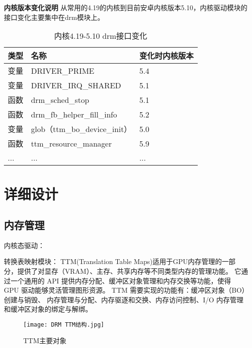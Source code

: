 \textbf{内核版本变化说明}
从常用的4.19的内核到目前安卓内核版本5.10，内核驱动模块的接口变化主要集中在drm模块上。
\begin{table}[h]
  \centering
  \caption{内核4.19-5.10 drm接口变化}
  \begin{tabular}{lll}
    \toprule
    类型   &   名称  &变化时内核版本  \\
    \midrule
    变量 & DRIVER\_PRIME & 5.4 \\
    变量 & DRIVER\_IRQ\_SHARED & 5.1 \\
    函数 & drm\_sched\_stop & 5.1 \\
    函数 & drm\_fb\_helper\_fill\_info & 5.2 \\
    变量 & glob（ttm\_bo\_device\_init） & 5.0 \\
    函数 & ttm\_resource\_manager & 5.9 \\
    ... & ... & ... \\
    \bottomrule
  \end{tabular}
\end{table}

\section{详细设计}
\subsection{内存管理}
内核态驱动：

转换表映射模块：
TTM(Translation Table Maps)适用于GPU内存管理的一部分，提供了对显存（VRAM）、主存、共享内存等不同类型内存的管理功能。
它通过一个通用的 API 提供内存分配、缓冲区对象管理和内存交换等功能，使得 GPU 驱动能够灵活管理图形资源。
TTM 需要实现的功能有：缓冲区对象（BO）创建与销毁、 内存管理与分配、内存驱逐和交换、内存访问控制、I/O 内存管理和缓冲区对象的绑定与解绑。
\begin{figure}[h]
  \centering
  \texttt{[image: DRM TTM结构.jpg]}
  \caption{TTM主要对象}
\end{figure}



